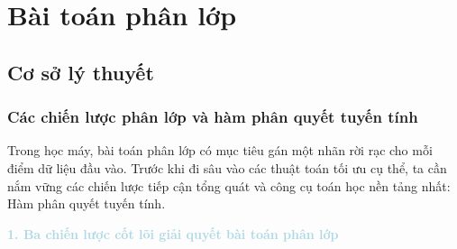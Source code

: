 \section{Bài toán phân lớp}

\subsection{Cơ sở lý thuyết}

\subsubsection{Các chiến lược phân lớp và hàm phân quyết tuyến tính}

Trong học máy, bài toán phân lớp có mục tiêu gán một nhãn rời rạc cho mỗi điểm dữ liệu đầu vào. Trước khi đi sâu vào các thuật toán tối ưu cụ thể, ta cần nắm vững các chiến lược tiếp cận tổng quát và công cụ toán học nền tảng nhất: Hàm phân quyết tuyến tính.

\vspace{0.5em}
\noindent\textcolor{lightblue}{\textbf{1. Ba chiến lược cốt lõi giải quyết bài toán phân lớp}}
\vspace{0.5em}

